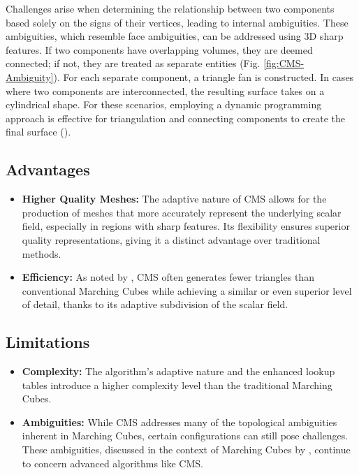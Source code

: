 \begin{itemize}
Challenges arise when determining the relationship between two components based solely on the signs of their vertices, leading to internal ambiguities. These ambiguities, which resemble face ambiguities, can be addressed using 3D sharp features. If two components have overlapping volumes, they are deemed connected; if not, they are treated as separate entities (Fig. \ref{fig:CMS-Ambiguity}). For each separate component, a triangle fan is constructed. In cases where two components are interconnected, the resulting surface takes on a cylindrical shape. For these scenarios, employing a dynamic programming approach is effective for triangulation and connecting components to create the final surface (\cite{Sreeparna_2017}).
\end{itemize}

\subsection{Advantages}
\begin{itemize}
\item \textbf{Higher Quality Meshes:} The adaptive nature of CMS allows for the production of meshes that more accurately represent the underlying scalar field, especially in regions with sharp features. Its flexibility ensures superior quality representations, giving it a distinct advantage over traditional methods.
\item \textbf{Efficiency:} As noted by \cite{Chien-Chang_2005}, CMS often generates fewer triangles than conventional Marching Cubes while achieving a similar or even superior level of detail, thanks to its adaptive subdivision of the scalar field.
\end{itemize}

\subsection{Limitations}
\begin{itemize}
\item \textbf{Complexity:} The algorithm's adaptive nature and the enhanced lookup tables introduce a higher complexity level than the traditional Marching Cubes.
\item \textbf{Ambiguities:} While CMS addresses many of the topological ambiguities inherent in Marching Cubes, certain configurations can still pose challenges. These ambiguities, discussed in the context of Marching Cubes by \cite{Nielson_1991}, continue to concern advanced algorithms like CMS.
\end{itemize}

